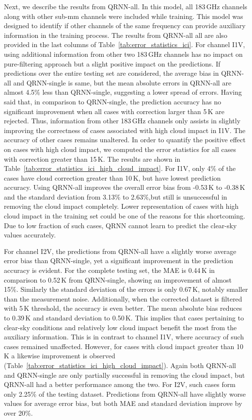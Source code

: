 \documentclass[amt, manuscript]{copernicus}
\begin{document}
Next, we describe the results from QRNN-all. In this model, all 183\,GHz channels along with other sub-mm channels were included while training. This model was designed to identify if other channels of the same frequency can provide auxiliary information in the training process. The results from QRNN-all all are also provided in the last columns of Table~\ref{tab:error_statistics_ici}. For channel I1V, using additional information from other two 183\,GHz channels has no impact on pure-filtering approach but a slight positive impact on the predictions. If predictions over the entire testing set are considered, the average bias in QRNN-all and QRNN-single is same, but the mean absolute errors in QRNN-all are almost 4.5\% less than QRNN-single, suggesting a lower spread of errors. Having said that, in comparison to QRNN-single, the prediction accuracy has no significant improvement when all cases with correction larger than 5\,K are rejected. Thus, information from other 183\,GHz channels only assists in slightly improving the correctness of cases associated with high cloud impact in I1V. The accuracy of other cases remains unaltered. In order to quantify the positive effect on cases with high cloud impact, we computed the error statistics for all cases with correction greater than 15\,K. The results are shown in Table~\ref{tab:error_statistics_ici_high_cloud_impact}. For I1V, only 4\% of the cases have cloud correction greater than 10\,K, but have lowest prediction accuracy. Using QRNN-all improves the overall error bias from -0.53\,K to -0.38\,K and the standard deviation from 3.13\% to 2.63\%,but still is unsuccessful in removing the cloud impact completely. Lower representation of cases with high cloud impact in the training set could be one of the reasons for this shortcoming. Due to low fraction of such cases, QRNN cannot learn to predict the clear-sky values accurately.  

For channel I2V, the predictions from QRNN-all have a slightly worse average error bias than QRNN-single, yet a significant improvement in the prediction accuracy is evident. For the complete testing set, the MAE is 0.44\,K in comparison to 0.52\,K from QRNN-single, showing an improvement of almost 15\%. Similarly the standard deviation of the errors is only 0.67\,K, notably smaller than the measurement noise. Additionally, when the  corrected dataset is filtered with 5\,K threshold, the accuracy is even better. The mean absolute bias reduces to 0.39\,K and standard deviation to 0.50\,K. This implies that cases pertaining to clear-sky conditions and relatively low cloud impact benefit the most from the auxiliary information. This is in contrast to channel I1V, where accuracy of such cases remained unaffected. However, for cases with cloud impact greater than 10\,K a likewise improvement is observed (Table~\ref{tab:error_statistics_ici_high_cloud_impact}). Again both QRNN-all and QRNN-single are only partially successful in removing the cloud impact, but QRNN-all had a better performance among the two. For I2V, such cases form only 2.25\% of the testing dataset. Predictions from QRNN-all have slightly worse values for average error bias, but both MAE and standard deviation improve by over 20\%.
   
\end{document}
